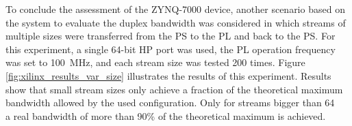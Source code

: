 
To conclude the assessment of the ZYNQ-7000 device, another scenario based on the system to evaluate the duplex bandwidth was considered in which streams of multiple sizes were transferred from the \ac{PS} to the \ac{PL} and back to the \ac{PS}. For this experiment, a single 64-bit \ac{HP} port was used, the \ac{PL} operation frequency was set to \SI{100}{\mega\hertz}, and each stream size was tested 200 times. Figure \ref{fig:xilinx_results_var_size} illustrates the results of this experiment. Results show that small stream sizes only achieve a fraction of the theoretical maximum bandwidth allowed by the used configuration. Only for streams bigger than \SI{64}{\kibi\byte} a real bandwidth of more than 90\% of the theoretical maximum is achieved.

